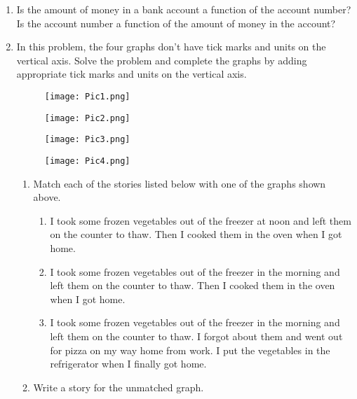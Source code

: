\documentclass[11pt,dvipsnames]{article}
\begin{document}
\begin{enumerate}[label=$\blacktriangleright$ {\bf  \arabic*:}]
	\item Is the amount of money in a bank account a function of the account number? Is the account number a function of the amount of money in the account?

\item In this problem, the four graphs don't have tick marks and units on the vertical axis. Solve the problem and complete the graphs by adding appropriate tick marks and units on the vertical axis.



\begin{figure}[ht] 
	\label{ fig7} 
	\begin{minipage}[b]{0.5\linewidth}
		\centering
		\texttt{[image: Pic1.png]} 
		\caption{} 
		\vspace{4ex}
	\end{minipage}%
	\begin{minipage}[b]{0.5\linewidth}
		\centering
		\texttt{[image: Pic2.png]} 
		\caption{} 
		\vspace{4ex}
	\end{minipage} 
	\begin{minipage}[b]{0.5\linewidth}
		\centering
		\texttt{[image: Pic3.png]} 
		\caption{} 
		\vspace{4ex}
	\end{minipage}%
	\begin{minipage}[b]{0.5\linewidth}
		\centering
		\texttt{[image: Pic4.png]} 
		\caption{} 
		\vspace{4ex}
	\end{minipage} 
\end{figure}



\begin{enumerate}[label=$\blacktriangleright$ {\bf  \Alph*:}] 
	\item Match each of the stories listed below with one of the graphs shown above.
	\begin{enumerate}[label= \fbox{\bf Story \arabic*}]
		\item 	I took some frozen vegetables out of the freezer at noon and left them on the counter to thaw. Then I cooked them in the oven when I got home.
		\item 	I took some frozen vegetables out of the freezer in the morning and left them on the counter to thaw. Then I cooked them in the oven when I got home.
		\item I took some frozen vegetables out of the freezer in the morning and left them on the counter to thaw. I forgot about them and went out for pizza on my way home from work. I put the vegetables in the refrigerator when I finally got home.
\end{enumerate}	
	\item Write a story for the unmatched graph.
\end{enumerate}	


\end{enumerate}
\end{document}
